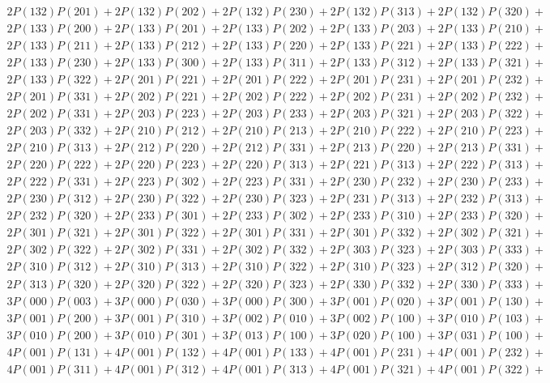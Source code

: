 \begin{align*}
	2P(132)P(201) + 2P(132)P(202) + 2P(132)P(230) + 2P(132)P(313) + 2P(132)P(320)+ \\
	2P(133)P(200) + 2P(133)P(201) + 2P(133)P(202) + 2P(133)P(203) + 2P(133)P(210)+ \\
	2P(133)P(211) + 2P(133)P(212) + 2P(133)P(220) + 2P(133)P(221) + 2P(133)P(222)+ \\
	2P(133)P(230) + 2P(133)P(300) + 2P(133)P(311) + 2P(133)P(312) + 2P(133)P(321)+ \\
	2P(133)P(322) + 2P(201)P(221) + 2P(201)P(222) + 2P(201)P(231) + 2P(201)P(232)+ \\
	2P(201)P(331) + 2P(202)P(221) + 2P(202)P(222) + 2P(202)P(231) + 2P(202)P(232)+ \\
	2P(202)P(331) + 2P(203)P(223) + 2P(203)P(233) + 2P(203)P(321) + 2P(203)P(322)+ \\
	2P(203)P(332) + 2P(210)P(212) + 2P(210)P(213) + 2P(210)P(222) + 2P(210)P(223)+ \\
	2P(210)P(313) + 2P(212)P(220) + 2P(212)P(331) + 2P(213)P(220) + 2P(213)P(331)+ \\
	2P(220)P(222) + 2P(220)P(223) + 2P(220)P(313) + 2P(221)P(313) + 2P(222)P(313)+ \\
	2P(222)P(331) + 2P(223)P(302) + 2P(223)P(331) + 2P(230)P(232) + 2P(230)P(233)+ \\
	2P(230)P(312) + 2P(230)P(322) + 2P(230)P(323) + 2P(231)P(313) + 2P(232)P(313)+ \\
	2P(232)P(320) + 2P(233)P(301) + 2P(233)P(302) + 2P(233)P(310) + 2P(233)P(320)+ \\
	2P(301)P(321) + 2P(301)P(322) + 2P(301)P(331) + 2P(301)P(332) + 2P(302)P(321)+ \\
	2P(302)P(322) + 2P(302)P(331) + 2P(302)P(332) + 2P(303)P(323) + 2P(303)P(333)+ \\
	2P(310)P(312) + 2P(310)P(313) + 2P(310)P(322) + 2P(310)P(323) + 2P(312)P(320)+ \\
	2P(313)P(320) + 2P(320)P(322) + 2P(320)P(323) + 2P(330)P(332) + 2P(330)P(333)+ \\
	3P(000)P(003) + 3P(000)P(030) + 3P(000)P(300) + 3P(001)P(020) + 3P(001)P(130)+ \\
	3P(001)P(200) + 3P(001)P(310) + 3P(002)P(010) + 3P(002)P(100) + 3P(010)P(103)+ \\
	3P(010)P(200) + 3P(010)P(301) + 3P(013)P(100) + 3P(020)P(100) + 3P(031)P(100)+ \\
	4P(001)P(131) + 4P(001)P(132) + 4P(001)P(133) + 4P(001)P(231) + 4P(001)P(232)+ \\
	4P(001)P(311) + 4P(001)P(312) + 4P(001)P(313) + 4P(001)P(321) + 4P(001)P(322)+ \\

\end{align*}
